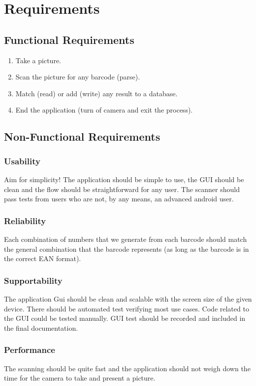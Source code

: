 \documentclass{report}
\begin{document}
\chapter{Requirements}

\section{Functional Requirements}

\begin{enumerate}
  \item Take a picture.
  \item Scan the picture for any barcode (parse).
  \item Match (read) or add (write) any result to a database.
  \item End the application (turn of camera and exit the process).
\end{enumerate}

\section{Non-Functional Requirements}

\subsection{Usability}
Aim for simplicity! The application should be simple to use, the GUI should be clean and the flow should be straightforward for any user. The scanner should pass tests from users who are not, by any means, an advanced android user.

\subsection{Reliability}
Each combination of numbers that we generate from each barcode should match the general combination that the barcode represents (as long as the barcode is in the correct EAN format).

\subsection{Supportability}
The application Gui should be clean and scalable with the screen size of the given device.
There should be automated test verifying most use cases. Code related to the GUI could be tested manually. GUI test should be recorded and included in the final documentation.

\subsection{Performance}
The scanning should be quite fast and the application should not weigh down the time for the camera to take and present a picture.
\end{document}
